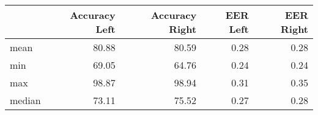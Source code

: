 \begin{tabular}{lrrrr}
\toprule
{} &  Accuracy Left &  Accuracy Right &  EER Left &  EER Right \\
\midrule
mean   &          80.88 &           80.59 &      0.28 &       0.28 \\
min    &          69.05 &           64.76 &      0.24 &       0.24 \\
max    &          98.87 &           98.94 &      0.31 &       0.35 \\
median &          73.11 &           75.52 &      0.27 &       0.28 \\
\bottomrule
\end{tabular}
